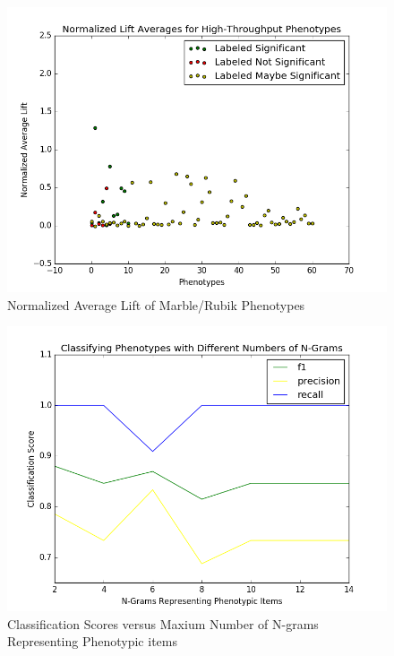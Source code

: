 \documentclass{sig-alternate-05-2015}
\begin{document}
\begin{figure} [t]
\centering
\includegraphics[width=\linewidth]{kho_josh_all2.png}
\caption{Normalized Average Lift of Marble/Rubik Phenotypes}
\label{fig:kho-josh-all}
\end{figure}

\begin{figure} [t]
\centering
\includegraphics[width=\linewidth] {classificationWithVariableNG.png}
\caption{Classification Scores versus Maxium Number of N-grams Representing Phenotypic items}
\label{fig:classificationVarNG}
\end{figure}
\end{document}
